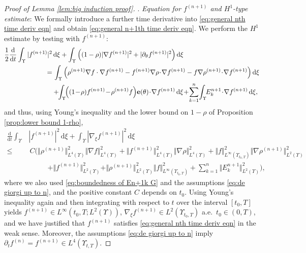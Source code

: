 \documentclass[11pt,a4paper,reqno]{amsart}
\theoremstyle{remark}
\theoremstyle{definition}
\numberwithin{equation}{section}
\newcommand{\e}{{\bf e}}
\newcommand{\bxi}{\xi}
\renewcommand{\d}{\, \mathrm{d} }
\newcommand{\der}{\mathrm{d}}
\begin{document}
\begin{proof}[Proof of Lemma \ref{lem:big induction proof}]
\smallskip 

. \textit{Equation for $f^{(n+1)}$ and $H^1$-type estimate}: We formally introduce a further time derivative into \eqref{eq:general nth time deriv eqn} and obtain \eqref{eq:general n+1th time deriv eqn}. We perform the $H^1$ estimate by testing with $f^{(n+1)}$: 
\begin{equation*}
    \begin{aligned}
        \frac{1}{2}\frac{\der}{\der t}\int_\Upsilon |f^{(n+1)}|^2 & \d \bxi + \int_\Upsilon \Big(  (1-\rho)|\nabla f^{(n+1)}|^2 + |\partial_\theta f^{(n+1)}|^2 \Big) \d \bxi \\ 
        =& \, \int_\Upsilon \Big( \rho^{(n+1)}\nabla f \cdot \nabla f^{(n+1)} - f^{(n+1)}\nabla \rho \!\cdot\! \nabla f^{(n+1)} - f \nabla \rho^{(n+1)}\!\cdot\! \nabla f^{(n+1)} \Big) \d \bxi \\ 
        &+\!\! \int_\Upsilon\!\! \Big( (1\!-\!\rho) f^{(n+1)} \!-\! \rho^{(n+1)}f \Big) \e(\theta) \!\cdot\! \nabla f^{(n+1)} \d \bxi \!+\! \sum_{k=1}^n \!\int_\Upsilon \!\! E^{n+1}_k \!\cdot\! \nabla f^{(n+1)} \d \bxi, 
    \end{aligned}
\end{equation*}
and thus, using Young's inequality and the lower bound on $1\!-\!\rho$ of Proposition \ref{prop:lower bound 1-rho}, 
\begin{equation*}
    \begin{aligned}
        \frac{\der}{\der t}\int_\Upsilon & |f^{(n+1)}|^2 \d \bxi + \int_\Upsilon |\nabla_{\bxi}f^{(n+1)}|^2 \d \bxi \\ 
        \leq& \, C \Big( \Vert \rho^{(n+1)}\Vert_{L^4(\Upsilon)}^2 \Vert \nabla f \Vert_{L^4(\Upsilon)}^2 \!+\! \Vert f^{(n+1)}\Vert_{L^4(\Upsilon)}^2 \Vert \nabla \rho \Vert_{L^4(\Upsilon)}^2 \!+\! \Vert f \Vert_{L^\infty(\Upsilon_{t_0,T})}^2 \Vert \nabla \rho^{(n+1)} \Vert^2_{L^2(\Upsilon)} \\ 
        &\,\,\,\,\,\,\,\,\,\,\,\,\,\,\,\, + \Vert f^{(n+1)} \Vert^2_{L^2(\Upsilon)} + \Vert \rho^{(n+1)} \Vert^2_{L^2(\Upsilon)} \Vert f \Vert_{L^\infty(\Upsilon_{t_0,T})}^2 + \sum_{k=1}^n \Vert E^{n+1}_k \Vert^2_{L^2(\Upsilon)} \Big) , 
    \end{aligned}
\end{equation*}
where we also used \eqref{eq:boundedness of En+1k G} and the assumptions \eqref{eq:de giorgi up to n}, and the positive constant $C$ depends on $t_0$. Using Young's inequality again and then integrating with respect to $t$ over the interval $[t_0,T]$ yields $f^{(n+1)} \in L^\infty(t_0,T;L^2(\Upsilon))$, $\nabla_{\bxi} f^{(n+1)} \in L^2(\Upsilon_{t_0,T})$ a.e.~$t_0 \in (0,T)$, and we have justified that $f^{(n+1)}$ satisfies \eqref{eq:general nth time deriv eqn} in the weak sense. Moreover, the assumptions \eqref{eq:de giorgi up to n} imply $\partial_t f^{(n)} = f^{(n+1)} \in L^4(\Upsilon_{t,T})$. 


\end{proof}
\end{document}
